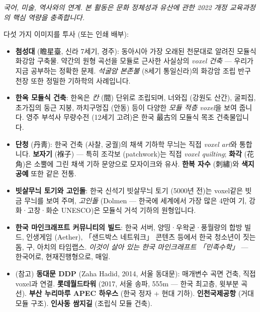 \documentclass[12pt,a4paper]{scrartcl}
\newcommand{\acc}[1]{\textcolor{accent}{\textbf{#1}}}
\newcommand{\tempo}[1]{\textnormal{\footnotesize\color{bg!90!white}\textsf{#1}}}
\begin{document}
\begin{hwaldong}[3.4 --- 한국 시각 유산과의 대화 \quad\tempo{10분}]\label{at:34}
\emph{국어, 미술, 역사와의 연계. 본 활동은 문화 정체성과 유산에 관한 2022 개정 교육과정의 핵심 역량을 충족합니다.}

다섯 가지 이미지를 투사 (또는 인쇄 배부):

\begin{itemize}[leftmargin=1.3em,itemsep=0.2em,topsep=0.3em,nosep]
  \item \acc{첨성대} (瞻星臺, 신라 7세기, 경주): 동아시아 가장 오래된 천문대로 알려진 모듈식 화강암 구축물. 약간의 원형 곡선을 모듈로 근사한 사실상의 \emph{voxel 건축} --- 우리가 지금 공부하는 정확한 문제. \emph{석굴암 본존불} (8세기 통일신라)의 화강암 조립 반구 천장 또한 정밀한 기하학의 사례입니다.

  \item \acc{한옥 모듈식 건축}: 한옥은 \emph{칸} (間) 단위로 조립되며, 너와집 (강원도 산간), 굴피집, 초가집의 둥근 지붕, 까치구멍집 (안동) 등이 다양한 \emph{모듈 적층 voxel}을 보여 줍니다. 영주 부석사 무량수전 (12세기 고려)은 한국 最古의 모듈식 목조 건축물입니다.

  \item \acc{단청} (丹靑): 한국 건축 (사찰, 궁궐)의 채색 기하학 무늬는 직접 \emph{voxel art}와 통합니다. \acc{보자기} (褓子) — 특히 조각보 (patchwork)는 직접 \emph{voxel quilting}; \acc{화각} (花角)은 소뿔에 그린 채색 기하 문양으로 모자이크와 유사. \acc{한복 자수} (刺繡)와 \acc{색지 공예} 또한 같은 전통.

  \item \acc{빗살무늬 토기와 고인돌}: 한국 신석기 빗살무늬 토기 (5000년 전)는 voxel같은 빗금 무늬를 보여 주며, \emph{고인돌} (Dolmen — 한국에 세계에서 가장 많은 4만여 기, 강화·고창·화순 UNESCO)은 모듈식 거석 기하의 원형입니다.

  \item \acc{한국 마인크래프트 커뮤니티의 빌드}: 한국 서버, 양띵·우왁굳·풍월량의 합방 빌드, 인생게임 (Aether), 「샌드박스 네트워크」 콘텐츠 등에서 한국 청소년이 짓는 돔, 구, 아치의 타임랩스. \emph{이것이 살아 있는 한국 마인크래프트 「민족수학」} — 한국어로, 현재진행형으로, 매일.

  \item (참고) \acc{동대문 DDP} (Zaha Hadid, 2014, 서울 동대문): 매개변수 곡면 건축, 직접 voxel과 연결. \acc{롯데월드타워} (2017, 서울 송파, 555m — 한국 최고층, 윗부분 곡선). \acc{부산 누리마루 APEC 하우스} (한국 정자 + 현대 기하). \acc{인천국제공항} (거대 모듈 구조). \acc{인사동 쌈지길} (조립식 모듈 건축).
\end{itemize}


\end{hwaldong}
\end{document}
